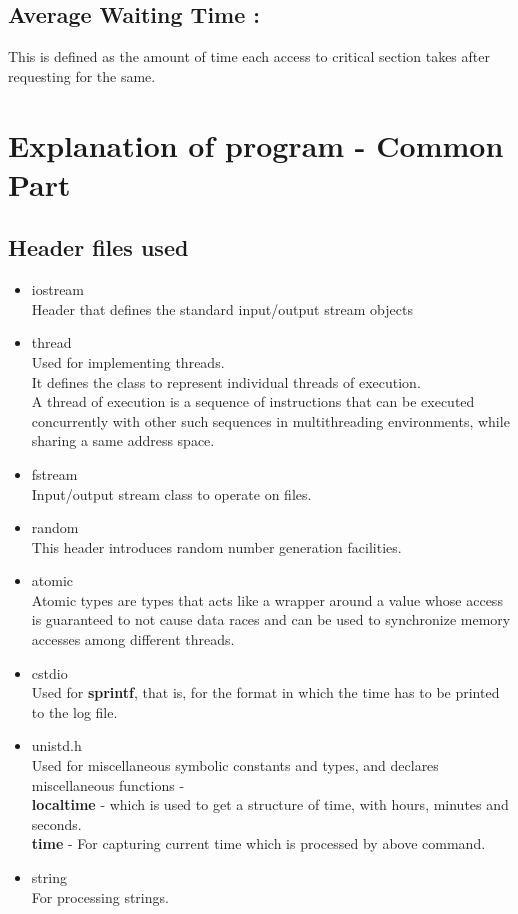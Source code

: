 \documentclass[12pt]{article}
\begin{document}
\subsection{Average Waiting Time :}
This is defined as the amount of time each access to critical section takes after requesting for the same.

\section{Explanation of program - Common Part}

\subsection{Header files used}
\begin{itemize}
\item iostream\\
Header that defines the standard input/output stream objects
\item thread\\
Used for implementing threads.\\
It defines the class to represent individual threads of execution.\\
A thread of execution is a sequence of instructions that can be executed concurrently with other such sequences in multithreading environments, while sharing a same address space.\\
\item fstream\\
Input/output stream class to operate on files.
\item random\\
This header introduces random number generation facilities.\\
\item atomic\\
Atomic types are types that acts like a wrapper around  a value whose access is guaranteed to not cause data races and can be used to synchronize memory accesses among different threads.
\item cstdio\\
Used for \textbf{sprintf}, that is, for the format in which the time has to be printed to the log file.
\item unistd.h\\
Used for miscellaneous symbolic constants and types, and declares miscellaneous functions - \\
\textbf{localtime} - which is used to get a structure of time, with hours, minutes and seconds.\\
\textbf{time} - For capturing current time which is processed by above command.
\item string\\
For processing strings.
\end{itemize}
\end{document}
